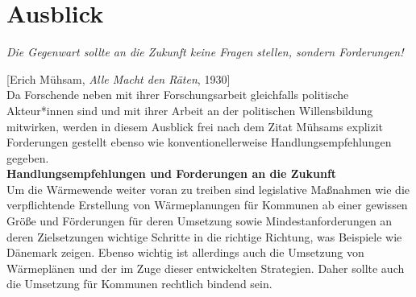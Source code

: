 		
		

	\section{Ausblick}
		\textit{\frqq Die Gegenwart sollte an die Zukunft keine Fragen stellen, sondern Forderungen!\flqq} 
		
		[Erich Mühsam, \textit{Alle Macht den Räten}, 1930]\\ 
		
		Da Forschende neben mit ihrer Forschungsarbeit gleichfalls politische Akteur*innen sind und mit ihrer Arbeit an der politischen Willensbildung mitwirken, werden in diesem Ausblick frei nach dem Zitat Mühsams explizit Forderungen gestellt ebenso wie konventionellerweise Handlungsempfehlungen gegeben. \\
		
		\textbf{Handlungsempfehlungen und Forderungen an die Zukunft}\\
		Um die Wärmewende weiter voran zu treiben sind legislative Maßnahmen wie die verpflichtende Erstellung von Wärmeplanungen für Kommunen ab einer gewissen Größe und Förderungen für deren Umsetzung sowie Mindestanforderungen an deren Zielsetzungen wichtige Schritte in die richtige Richtung, was Beispiele wie Dänemark zeigen. Ebenso wichtig ist allerdings auch die Umsetzung von Wärmeplänen und der im Zuge dieser entwickelten Strategien. Daher sollte auch die Umsetzung für Kommunen rechtlich bindend sein.
		
